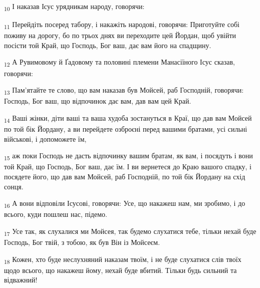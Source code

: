 \begin{tcolorbox}
\textsubscript{10} І наказав Ісус урядникам народу, говорячи:
\end{tcolorbox}
\begin{tcolorbox}
\textsubscript{11} Перейдіть посеред табору, і накажіть народові, говорячи: Приготуйте собі поживу на дорогу, бо по трьох днях ви переходите цей Йордан, щоб увійти посісти той Край, що Господь, Бог ваш, дає вам його на спадщину.
\end{tcolorbox}
\begin{tcolorbox}
\textsubscript{12} А Рувимовому й Ґадовому та половині племени Манасіїного Ісус сказав, говорячи:
\end{tcolorbox}
\begin{tcolorbox}
\textsubscript{13} Пам'ятайте те слово, що вам наказав був Мойсей, раб Господній, говорячи: Господь, Бог ваш, що відпочинок дає вам, дав вам цей Край.
\end{tcolorbox}
\begin{tcolorbox}
\textsubscript{14} Ваші жінки, діти ваші та ваша худоба зостануться в Краї, що дав вам Мойсей по той бік Йордану, а ви перейдете озброєні перед вашими братами, усі сильні військові, і допоможете їм,
\end{tcolorbox}
\begin{tcolorbox}
\textsubscript{15} аж поки Господь не дасть відпочинку вашим братам, як вам, і посядуть і вони той Край, що Господь, Бог ваш, дає їм. І ви вернетеся до Краю вашого спадку, і посядете його, що дав вам Мойсей, раб Господній, по той бік Йордану на схід сонця.
\end{tcolorbox}
\begin{tcolorbox}
\textsubscript{16} А вони відповіли Ісусові, говорячи: Усе, що накажеш нам, ми зробимо, і до всього, куди пошлеш нас, підемо.
\end{tcolorbox}
\begin{tcolorbox}
\textsubscript{17} Усе так, як слухалися ми Мойсея, так будемо слухатися тебе, тільки нехай буде Господь, Бог твій, з тобою, як був Він із Мойсеєм.
\end{tcolorbox}
\begin{tcolorbox}
\textsubscript{18} Кожен, хто буде неслухняний наказам твоїм, і не буде слухатися слів твоїх щодо всього, що накажеш йому, нехай буде вбитий. Тільки будь сильний та відважний!
\end{tcolorbox}
